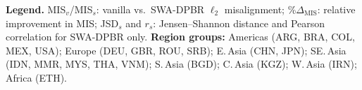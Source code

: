 \begin{table}[tp]
{\begin{tabular}{@{}ll ccccc ccccc ccccc ccccc ccccc ccccc@{}}
\bottomrule
\end{tabular}%
}
\vspace{3pt}\footnotesize \textbf{Legend.} MIS$_v$/MIS$_s$: vanilla vs.\ SWA-DPBR $\ell_2$ misalignment; \%$\Delta_{\mathrm{MIS}}$: relative improvement in MIS; JSD$_s$ and $r_s$: Jensen--Shannon distance and Pearson correlation for SWA-DPBR only. \textbf{Region groups:} Americas (ARG, BRA, COL, MEX, USA); Europe (DEU, GBR, ROU, SRB); E.\,Asia (CHN, JPN); SE.\,Asia (IDN, MMR, MYS, THA, VNM); S.\,Asia (BGD); C.\,Asia (KGZ); W.\,Asia (IRN); Africa (ETH).
\end{table}
